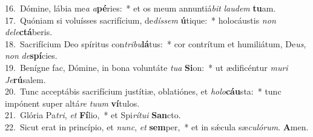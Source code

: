 {16.~}Dómine, lábia me\textit{a} \textit{a}\textbf{pé}ries:~* et os meum annuntiá\textit{bit} \textit{lau}\textit{dem} \textbf{tu}am.\\
{17.~}Quóniam si voluísses sacrifícium, de\textit{dís}\textit{sem} \textbf{ú}tique:~* holocáustis \textit{non} \textit{de}\textit{le}\textbf{ctá}beris.\\
{18.~}Sacrifícium Deo spíritus con\textit{tri}\textit{bu}\textbf{lá}tus:~* cor contrítum et humiliátum, De\textit{us}, \textit{non} \textit{de}\textbf{spí}cies.\\
{19.~}Benígne fac, Dómine, in bona voluntáte \textit{tu}\textit{a} \textbf{Si}on:~* ut ædificéntur \textit{mu}\textit{ri} \textit{Je}\textbf{rú}salem.\\
{20.~}Tunc acceptábis sacrifícium justítiæ, oblatiónes, et \textit{ho}\textit{lo}\textbf{cáu}sta:~* tunc impónent super altá\textit{re} \textit{tu}\textit{um} \textbf{ví}tulos.\\
{21.~}Glória Pa\textit{tri}, \textit{et} \textbf{Fí}lio,~* et Spi\textit{rí}\textit{tu}\textit{i} \textbf{San}cto.\\
{22.~}Sicut erat in princípio, et \textit{nunc}, \textit{et} \textbf{sem}per,~* et in sǽcula sæ\textit{cu}\textit{ló}\textit{rum}. \textbf{A}men.\\
